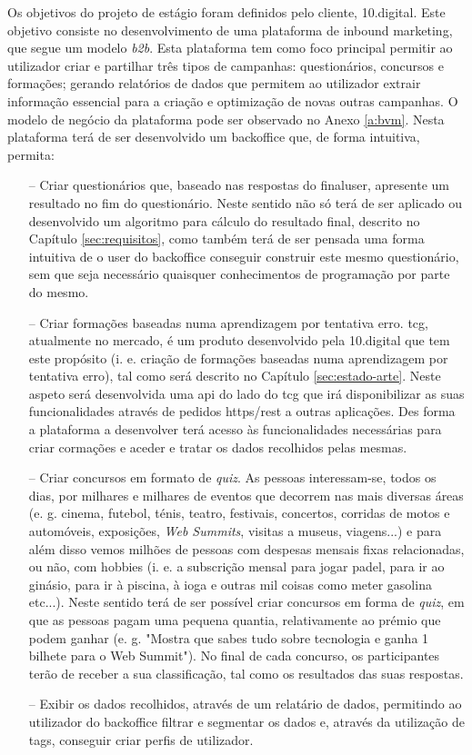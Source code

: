 Os objetivos do projeto de estágio foram definidos pelo cliente, 10.digital. Este objetivo consiste no desenvolvimento de uma plataforma de inbound marketing, que segue um modelo \textit{\gls{b2b}}. Esta plataforma tem como foco principal permitir ao utilizador criar e partilhar três tipos de campanhas: questionários, concursos e formações; gerando relatórios de dados que permitem ao utilizador extrair informação essencial para a criação e optimização de novas outras campanhas. O modelo de negócio da plataforma pode ser observado no Anexo \ref{a:bvm}. Nesta plataforma terá de ser desenvolvido um \gls{backoffice} que, de forma intuitiva, permita:
\begin{itemize}
	\item[--] Criar questionários que, baseado nas respostas do \gls{finaluser}, apresente um resultado no fim do questionário. Neste sentido não só terá de ser aplicado ou desenvolvido um algoritmo para cálculo do resultado final, descrito no Capítulo \ref{sec:requisitos}, como também terá de ser pensada uma forma intuitiva de o \gls{user} do \gls{backoffice} conseguir construir este mesmo questionário, sem que seja necessário quaisquer conhecimentos de programação por parte do mesmo.
	\item[--] Criar formações baseadas numa aprendizagem por tentativa erro. \acrfull{tcg}\cite{tcg}, atualmente no mercado, é um produto desenvolvido pela 10.digital que tem este propósito (i. e. criação de formações baseadas numa aprendizagem por tentativa erro), tal como será descrito no Capítulo \ref{sec:estado-arte}. Neste aspeto será desenvolvida uma \acrshort{api} do lado do \acrshort{tcg} que irá disponibilizar as suas funcionalidades através de pedidos \acrshort{https}/\acrshort{rest} a outras aplicações. Des forma a plataforma a desenvolver terá acesso às funcionalidades necessárias para criar cormações e aceder e tratar os dados recolhidos pelas mesmas.	
	\item[--] Criar concursos em formato de \textit{quiz}. As pessoas interessam-se, todos os dias, por milhares e milhares de eventos que decorrem nas mais diversas áreas (e. g. 	cinema, futebol, ténis, teatro, festivais, concertos, corridas de motos e automóveis, exposições, \textit{Web Summits}\cite{websummit}, visitas a museus, viagens...) e para além disso
	vemos milhões de pessoas com despesas mensais fixas relacionadas, ou não, com hobbies (i. e. a subscrição mensal para jogar padel, para ir ao ginásio, para ir à piscina, à ioga e outras mil coisas como meter gasolina etc...). Neste sentido terá de ser possível criar concursos em forma de \textit{quiz}, em que as pessoas pagam uma pequena quantia, relativamente ao prémio que podem ganhar (e. g. "Mostra que sabes tudo sobre tecnologia e ganha 1 bilhete para o Web Summit"). No final de cada concurso, os participantes terão de receber a sua classificação, tal como os resultados das suas respostas.
	\item[--] Exibir os dados recolhidos, através de um relatário de dados, permitindo ao utilizador do \gls{backoffice} filtrar e segmentar os dados e, através da utilização de \gls{tags}, conseguir criar perfis de utilizador.
\end{itemize}



